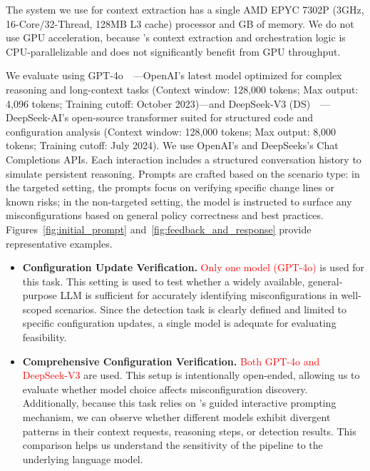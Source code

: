 The system we use for context extraction has a single AMD EPYC 7302P (3GHz, 16-Core/32-Thread, 128MB L3 cache) processor and GB of memory.
We do not use GPU acceleration, because \sysname{}'s context extraction and orchestration logic is CPU-parallelizable and does not significantly benefit from GPU throughput.

We evaluate \sysname{} using GPT-4o~~\cite{openai_gpt4o}---OpenAI's latest model optimized for complex reasoning and long-context tasks (Context window: 128,000 tokens; Max output: 4,096 tokens; Training cutoff: October 2023)---and DeepSeek-V3 (DS)~~\cite{deepseekai2024deepseekv3technicalreport}---DeepSeek-AI's open-source transformer suited for structured code and configuration analysis (Context window: 128,000 tokens; Max output: 8,000 tokens; Training cutoff: July 2024). We use OpenAI's and DeepSeeks's Chat Completions APIs.  Each interaction includes a structured conversation history to simulate persistent reasoning.  Prompts are crafted based on the scenario type: in the targeted setting, the prompts focus on verifying specific change lines or known risks; in the non-targeted setting, the model is instructed to surface any misconfigurations based on general policy correctness and best practices. Figures~\ref{fig:initial_prompt} and~\ref{fig:feedback_and_response} provide representative examples.

 
\begin{itemize}
\item \textbf{Configuration Update Verification.} \textcolor{red}{Only one model (GPT-4o)} is used for this task. This setting is used to test whether a widely available, general-purpose LLM is sufficient for accurately identifying misconfigurations in well-scoped scenarios. Since the detection task is clearly defined and limited to specific configuration updates, a single model is adequate for evaluating feasibility.

\item \textbf{Comprehensive Configuration Verification.} \textcolor{red}{Both GPT-4o and DeepSeek-V3} are used. This setup is intentionally open-ended, allowing us to evaluate whether model choice affects misconfiguration discovery. Additionally, because this task relies on \sysname{}'s guided interactive prompting mechanism, we can observe whether different models exhibit divergent patterns in their context requests, reasoning steps, or detection results. This comparison helps us understand the sensitivity of the \sysname{} pipeline to the underlying language model.
\end{itemize}



